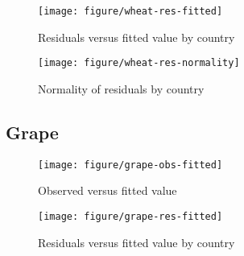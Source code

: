 \documentclass[nojss]{jss}\usepackage[]{graphicx}\usepackage[]{color}
\makeatletter
\def\maxwidth{ %
  \ifdim\Gin@nat@width>\linewidth
    \linewidth
  \else
    \Gin@nat@width
  \fi
}
\newenvironment{knitrout}{}{} %
\makeatother
\begin{document}
\begin{knitrout}
\color{fgcolor}\begin{figure}[!ht]


{\centering \texttt{[image: figure/wheat-res-fitted]} 

}

\caption[Residuals versus fitted value by country]{Residuals versus fitted value by country\label{fig:wheat-res-fitted}}
\end{figure}


\end{knitrout}


\begin{knitrout}
\color{fgcolor}\begin{figure}[!ht]


{\centering \texttt{[image: figure/wheat-res-normality]} 

}

\caption[Normality of residuals by country]{Normality of residuals by country\label{fig:wheat-res-normality}}
\end{figure}


\end{knitrout}


\subsection*{Grape}
\begin{knitrout}
\color{fgcolor}\begin{figure}[!ht]


{\centering \texttt{[image: figure/grape-obs-fitted]} 

}

\caption[Observed versus fitted value]{Observed versus fitted value\label{fig:grape-obs-fitted}}
\end{figure}


\end{knitrout}



\begin{knitrout}
\color{fgcolor}\begin{figure}[!ht]


{\centering \texttt{[image: figure/grape-res-fitted]} 

}

\caption[Residuals versus fitted value by country]{Residuals versus fitted value by country\label{fig:grape-res-fitted}}
\end{figure}


\end{knitrout}
\end{document}
